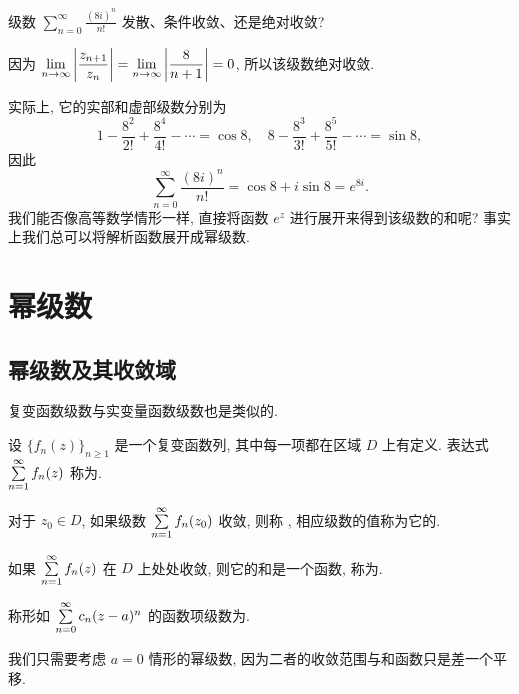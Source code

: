 \begin{example}
	级数 $\displaystyle\sum_{n=0}^\infty\frac{(8i)^n}{n!}$ 发散、条件收敛、还是绝对收敛?
\end{example}

\begin{solution}
	因为 $\displaystyle\lim_{n\to\infty}\left|\frac{z_{n+1}}{z_n}\right|=\lim_{n\to\infty}\left|\dfrac{8}{n+1}\right|=0$, 所以该级数绝对收敛.
\end{solution}

实际上, 它的实部和虚部级数分别为
\[
	1-\frac{8^2}{2!}+\frac{8^4}{4!}-\cdots=\cos 8,\quad
	8-\frac{8^3}{3!}+\frac{8^5}{5!}-\cdots=\sin 8,
\]
因此
\[
	\sum_{n=0}^\infty\frac{(8i)^n}{n!}=\cos 8+i\sin 8=e^{8i}.
\]
我们能否像高等数学情形一样, 直接将函数 $e^z$ 进行展开来得到该级数的和呢?
事实上我们总可以将解析函数展开成幂级数.


\section{幂级数}

\subsection{幂级数及其收敛域}

复变函数级数与实变量函数级数也是类似的.

\begin{definition}
	\begin{enumpar}
		\item 设 $\{f_n(z)\}_{n\ge 1}$ 是一个复变函数列, 其中每一项都在区域 $D$ 上有定义.
		表达式 $\sum\limits_{n=1}^\infty f_n(z)$ 称为.
		\item 对于 $z_0\in D$, 如果级数 $\sum\limits_{n=1}^\infty f_n(z_0)$ 收敛, 则称 , 相应级数的值称为它的.
		\item 如果 $\sum\limits_{n=1}^\infty f_n(z)$ 在 $D$ 上处处收敛, 则它的和是一个函数, 称为.
	\end{enumpar}
\end{definition}

\begin{definition}
	称形如 $\sum\limits_{n=0}^\infty c_n(z-a)^n$ 的函数项级数为.\footnotemark
\end{definition}

我们只需要考虑 $a=0$ 情形的幂级数, 因为二者的收敛范围与和函数只是差一个平移.

